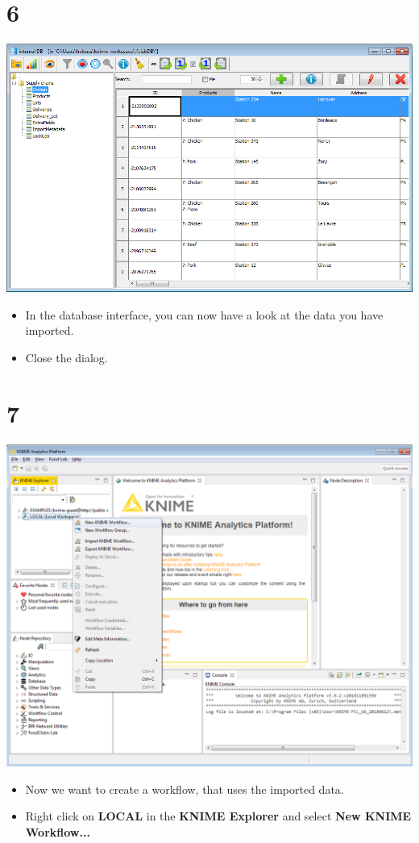 \documentclass[10pt]{beamer}
\begin{document}
\section{6}
\begin{frame}
	\begin{center}
  		\includegraphics[height=0.6\textheight]{6.png}
	\end{center}
	\begin{itemize}
		\item In the database interface, you can now have a look at the data you have imported.
		\item Close the dialog.
	\end{itemize}
\end{frame}

\section{7}
\begin{frame}
	\begin{center}
  		\includegraphics[height=0.6\textheight]{7.png}
	\end{center}
	\begin{itemize}
		\item Now we want to create a workflow, that uses the imported data.
		\item Right click on \textbf{LOCAL} in the \textbf{KNIME Explorer} and select \textbf{New KNIME Workflow...}
	\end{itemize}
\end{frame}
\end{document}
